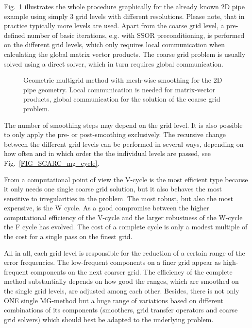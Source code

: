 \newpage
Fig.~\ref{FIG_SCARC_mg_method} illustrates the whole procedure graphically
for the already known 2D pipe example using simply 3 grid levels with different resolutions. Please note, that in practice typically more levels are used. Apart from the coarse grid level, a pre-defined number of basic iterations, e.g. with SSOR preconditioning, is performed on the different grid levels, which only requires local communication when calculating the global matrix vector products. The coarse grid problem is usually solved using a direct solver, which in turn requires global communication.
\vspace{0.2cm}
\begin{figure}[ht]
\centering
\caption{Geometric multigrid method with mesh-wise smoothing for the 2D pipe geometry. Local communication is needed for matrix-vector products, global communication for the solution of the coarse grid problem. }
\label{FIG_SCARC_mg_method}
\end{figure}


The number of smoothing steps may depend on the grid level. It is also possible to only apply the pre- or post-smoothing exclusively.
The recursive change between the different grid levels can be performed in several ways, depending on how
often and in which order the the individual levels are passed, see Fig.~\ref {FIG_SCARC_mg_cycle}.


From a computational point of view the V-cycle is the most efficient type because it only needs one single coarse grid solution, but it also behaves the most sensitive to irregularities in the problem.
The most robust, but also the most expensive, is the W cycle. As a good compromise between
the higher computational efficiency of the V-cycle and the larger 
robustness of the W-cycle the F cycle has evolved.
The cost of a complete cycle is only a modest multiple of the cost for a single pass on the finest grid.


All in all, each grid level is responsible for the reduction of a certain range of the error frequencies. The low-frequent components on a finer grid appear as high-frequent components on the next coarser grid. The efficiency of the complete method substantially depends on how good the ranges, which are smoothed on the single grid levels, are adjusted among each other.
%
Besides, there is not only ONE single MG-method but a huge range of variations based on different combinations of its components (smoothers, grid transfer operators and coarse grid solvers) which should best be adapted to the underlying problem.

